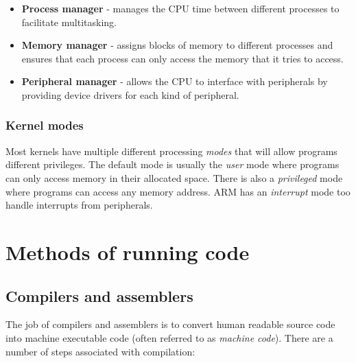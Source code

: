 \begin{itemize}
	\item {\bf Process manager} - manages the CPU time between different
	processes to facilitate multitasking.
	\item {\bf Memory manager} - assigns blocks of memory to different processes
	and ensures that each process can only access the memory that it tries to
	access.
	\item {\bf Peripheral manager} - allows the CPU to interface with
	peripherals by providing device drivers for each kind of peripheral.
\end{itemize}

\subsubsection{Kernel modes}

Most kernels have multiple different processing {\it modes} that will allow
programs different privileges. The default mode is usually the {\it user} mode
where programs can only access memory in their allocated space. There is also a
{\it privileged} mode where programs can access any memory address. ARM has an
{\it interrupt} mode too handle interrupts from peripherals.

\section{Methods of running code}

\subsection{Compilers and assemblers}

The job of compilers and assemblers is to convert human readable source code
into machine executable code (often referred to as {\it machine code}). There
are a number of steps associated with compilation:

